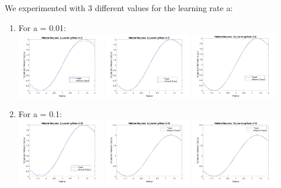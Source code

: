 \documentclass{article}
\begin{document}
\noindent We experimented with 3 different values for the learning rate a:
\begin{enumerate}
  \item For a = 0.01: \\
  \includegraphics[width=0.3\textwidth]{Problem4_2_0.01.png}
  \includegraphics[width=0.3\textwidth]{Problem4_8_0.01.png}
  \includegraphics[width=0.3\textwidth]{Problem4_12_0.01.png}
  \item For a = 0.1: \\
  \includegraphics[width=0.3\textwidth]{Problem4_2_0.1.png}
  \includegraphics[width=0.3\textwidth]{Problem4_8_0.1.png}
  \includegraphics[width=0.3\textwidth]{Problem4_12_0.1.png}

\end{enumerate}
\end{document}
